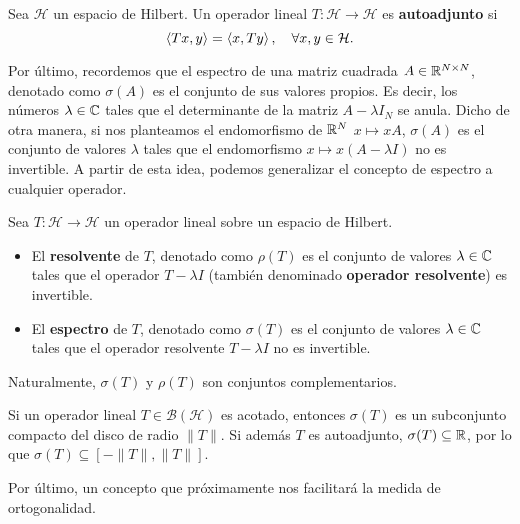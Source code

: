     \begin{definicion}
        Sea $\mathcal{H}$ un espacio de Hilbert. Un operador lineal $T:\mathcal H \longrightarrow \mathcal{H}$ es \textbf{autoadjunto} si
        \begin{equation}
            \label{eq:operador-autoadjunto}
            \left\langle Tx , y \right\rangle = \left\langle x , Ty \right\rangle, \ \ \ \forall x,y\in \mathcal H.
        \end{equation}
    \end{definicion}

    Por último, recordemos que el espectro de una matriz cuadrada $A\in\mathbb{R}^{N\times N}$, denotado como $\sigma(A)$ es el conjunto de sus valores propios. Es decir, los números $\lambda\in\mathbb{C}$ tales que el determinante de la matriz $A-\lambda I_N$ se anula. Dicho de otra manera, si nos planteamos el endomorfismo de $\mathbb{R}^N$ $x\mapsto xA$, $\sigma(A)$ es el conjunto de valores $\lambda$ tales que el endomorfismo $x\mapsto x(A-\lambda I)$ no es invertible. A partir de esta idea, podemos generalizar el concepto de espectro a cualquier operador.
    
    \begin{definicion}
        Sea $T:\mathcal H \longrightarrow \mathcal{H}$ un operador lineal sobre un espacio de Hilbert. 
        \begin{itemize}
            \item El \textbf{resolvente} de $T$, denotado como $\rho(T)$ es el conjunto de valores $\lambda\in\mathbb{C}$ tales que el operador $T-\lambda I$ (también denominado \textbf{operador resolvente}) es invertible.
            \item El \textbf{espectro} de $T$, denotado como $\sigma(T)$ es el conjunto de valores $\lambda\in\mathbb{C}$ tales que el operador resolvente $T-\lambda I$ no es invertible.
        \end{itemize}
        Naturalmente, $\sigma(T)$ y $\rho(T)$ son conjuntos complementarios.
    \end{definicion}

    Si un operador lineal $T\in\mathcal{B}(\mathcal{H})$ es acotado, entonces $\sigma(T)$ es un subconjunto compacto del disco de radio $\|T\|$. Si además $T$ es autoadjunto, $\sigma(T)\subseteq\mathbb{R}$, por lo que $\sigma(T)\subseteq[-\|T\|,\|T\|]$.

    Por último, un concepto que próximamente nos facilitará la medida de ortogonalidad.
    
